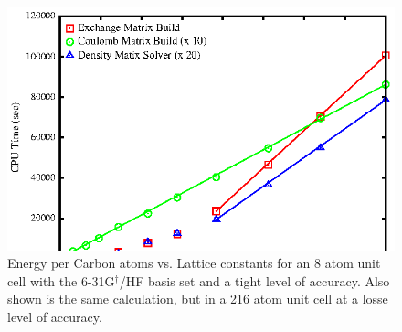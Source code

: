 \documentclass[prb,aps,nobibnotes,twocolumn,doublespace,twocolumngrid,superbib]{revtex4}
\begin{document}
%
%
%
\begin{figure}
\caption{Energy per Carbon atoms vs. Lattice constants for an 8 atom 
unit cell with the 6-31G$ ^\dagger$/HF basis set and a tight level of accuracy. Also
shown is the same calculation, but in a 216 atom unit cell at a losse level
of accuracy.}
\label{figure:EnergyVsLattice}
{\centering \includegraphics{Timing_Diamond_ONX.ps} \par} 
\end{figure}

%
%
%
%
%
%
\end{document}

